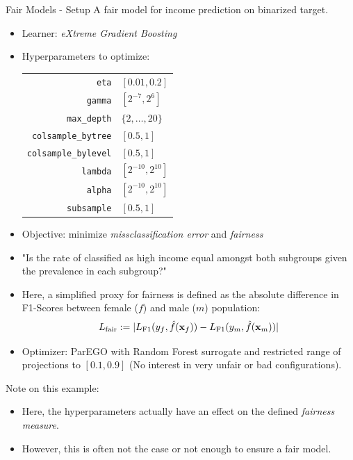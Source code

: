 \begin{frame}[allowframebreaks]{Fair Models - Setup}
  A fair model for income prediction on binarized target.
\begin{itemize}
  \item Learner: \emph{eXtreme Gradient Boosting}
  \item Hyperparameters to optimize: \\
  \begin{tabular}{rl}
    \texttt{eta} & $[0.01,0.2]$ \\
    \texttt{gamma} & $[2^{-7},2^6]$ \\
    \texttt{max\_depth} & $\{2, \ldots, 20\}$ \\
    \texttt{colsample\_bytree} & $[0.5,1]$ \\
    \texttt{colsample\_bylevel} & $[0.5,1]$ \\
    \texttt{lambda} & $[2^{-10},2^{10}]$ \\
    \texttt{alpha} & $[2^{-10},2^{10}]$ \\
    \texttt{subsample} & $[0.5,1]$ \\
  \end{tabular}
  \item Objective: minimize \emph{missclassification error} and \emph{fairness}
  \item "Is the rate of classified as high income equal amongst both subgroups given the prevalence in each subgroup?"
  \item Here, a simplified proxy for fairness is defined as the absolute difference in F1-Scores between female ($f$) and male ($m$) population:
  \[
  L_{\text{fair}} := |L_{\text{F1}}(y_f,\hat{f}(\mathbf{x}_f)) - L_{\text{F1}}(y_m,\hat{f}(\mathbf{x}_m))|
  \]
  \item Optimizer: ParEGO with Random Forest surrogate and restricted range of projections to $[0.1, 0.9]$ (No interest in very unfair or bad configurations).
\end{itemize}
\vspace{1em}
Note on this example:
\begin{itemize}
  \item Here, the hyperparameters actually have an effect on the defined \emph{fairness measure}.
  \item However, this is often not the case or not enough to ensure a fair model.
\end{itemize}

\end{frame}

